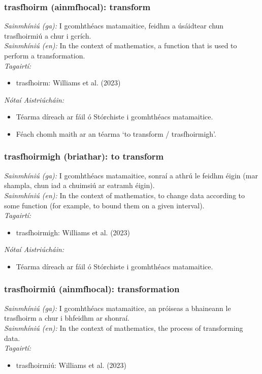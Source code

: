 \documentclass{article}
\begin{document}
\subsubsection*{trasfhoirm (ainmfhocal): transform}
 \noindent \textit{Sainmhíniú (ga):} I gcomhthéacs matamaitice, feidhm a úsáidtear chun trasfhoirmiú a chur i gcrích.
\\
 \noindent \textit{Sainmhíniú (en):} In the context of mathematics, a function that is used to perform a transformation.
\\
 \noindent \textit{Tagairtí:}
\begin{itemize}
	\item trasfhoirm: Williams et al. (2023) \cite{storchiste}
\end{itemize}

 \noindent \textit{Nótaí Aistriúcháin:}
\begin{itemize}
	\item Téarma díreach ar fáil ó Stórchiste i gcomhthéacs matamaitice.
	\item Féach chomh maith ar an téarma `to transform / trasfhoirmigh'.
\end{itemize}


\subsubsection*{trasfhoirmigh (briathar): to transform}
 \noindent \textit{Sainmhíniú (ga):} I gcomhthéacs matamaitice, sonraí a athrú le feidhm éigin (mar shampla, chun iad a chuimsiú ar eatramh éigin).
\\
 \noindent \textit{Sainmhíniú (en):} In the context of mathematics, to change data according to some function (for example, to bound them on a given interval).
\\
 \noindent \textit{Tagairtí:}
\begin{itemize}
	\item trasfhoirmigh: Williams et al. (2023) \cite{storchiste}
\end{itemize}

 \noindent \textit{Nótaí Aistriúcháin:}
\begin{itemize}
	\item Téarma díreach ar fáil ó Stórchiste i gcomhthéacs matamaitice.
\end{itemize}


\subsubsection*{trasfhoirmiú (ainmfhocal): transformation}
 \noindent \textit{Sainmhíniú (ga):} I gcomhthéacs matamaitice, an próiseas a bhaineann le trasfhoirm a chur i bhfeidhm ar shonraí.
\\
 \noindent \textit{Sainmhíniú (en):} In the context of mathematics, the process of transforming data.
\\
 \noindent \textit{Tagairtí:}
\begin{itemize}
	\item trasfhoirmiú: Williams et al. (2023) \cite{storchiste}
\end{itemize}
\end{document}

